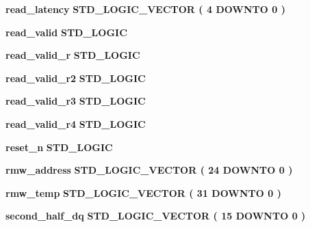 \begin{DoxyCompactItemize}
\item 
{\bf read\+\_\+latency} {\bfseries \textcolor{comment}{S\+T\+D\+\_\+\+L\+O\+G\+I\+C\+\_\+\+V\+E\+C\+T\+OR}\textcolor{vhdlchar}{ }\textcolor{vhdlchar}{(}\textcolor{vhdlchar}{ }\textcolor{vhdlchar}{ } \textcolor{vhdldigit}{4} \textcolor{vhdlchar}{ }\textcolor{keywordflow}{D\+O\+W\+N\+TO}\textcolor{vhdlchar}{ }\textcolor{vhdlchar}{ } \textcolor{vhdldigit}{0} \textcolor{vhdlchar}{ }\textcolor{vhdlchar}{)}\textcolor{vhdlchar}{ }} 
\item 
{\bf read\+\_\+valid} {\bfseries \textcolor{comment}{S\+T\+D\+\_\+\+L\+O\+G\+IC}\textcolor{vhdlchar}{ }} 
\item 
{\bf read\+\_\+valid\+\_\+r} {\bfseries \textcolor{comment}{S\+T\+D\+\_\+\+L\+O\+G\+IC}\textcolor{vhdlchar}{ }} 
\item 
{\bf read\+\_\+valid\+\_\+r2} {\bfseries \textcolor{comment}{S\+T\+D\+\_\+\+L\+O\+G\+IC}\textcolor{vhdlchar}{ }} 
\item 
{\bf read\+\_\+valid\+\_\+r3} {\bfseries \textcolor{comment}{S\+T\+D\+\_\+\+L\+O\+G\+IC}\textcolor{vhdlchar}{ }} 
\item 
{\bf read\+\_\+valid\+\_\+r4} {\bfseries \textcolor{comment}{S\+T\+D\+\_\+\+L\+O\+G\+IC}\textcolor{vhdlchar}{ }} 
\item 
{\bf reset\+\_\+n} {\bfseries \textcolor{comment}{S\+T\+D\+\_\+\+L\+O\+G\+IC}\textcolor{vhdlchar}{ }} 
\item 
{\bf rmw\+\_\+address} {\bfseries \textcolor{comment}{S\+T\+D\+\_\+\+L\+O\+G\+I\+C\+\_\+\+V\+E\+C\+T\+OR}\textcolor{vhdlchar}{ }\textcolor{vhdlchar}{(}\textcolor{vhdlchar}{ }\textcolor{vhdlchar}{ } \textcolor{vhdldigit}{24} \textcolor{vhdlchar}{ }\textcolor{keywordflow}{D\+O\+W\+N\+TO}\textcolor{vhdlchar}{ }\textcolor{vhdlchar}{ } \textcolor{vhdldigit}{0} \textcolor{vhdlchar}{ }\textcolor{vhdlchar}{)}\textcolor{vhdlchar}{ }} 
\item 
{\bf rmw\+\_\+temp} {\bfseries \textcolor{comment}{S\+T\+D\+\_\+\+L\+O\+G\+I\+C\+\_\+\+V\+E\+C\+T\+OR}\textcolor{vhdlchar}{ }\textcolor{vhdlchar}{(}\textcolor{vhdlchar}{ }\textcolor{vhdlchar}{ } \textcolor{vhdldigit}{31} \textcolor{vhdlchar}{ }\textcolor{keywordflow}{D\+O\+W\+N\+TO}\textcolor{vhdlchar}{ }\textcolor{vhdlchar}{ } \textcolor{vhdldigit}{0} \textcolor{vhdlchar}{ }\textcolor{vhdlchar}{)}\textcolor{vhdlchar}{ }} 
\item 
{\bf second\+\_\+half\+\_\+dq} {\bfseries \textcolor{comment}{S\+T\+D\+\_\+\+L\+O\+G\+I\+C\+\_\+\+V\+E\+C\+T\+OR}\textcolor{vhdlchar}{ }\textcolor{vhdlchar}{(}\textcolor{vhdlchar}{ }\textcolor{vhdlchar}{ } \textcolor{vhdldigit}{15} \textcolor{vhdlchar}{ }\textcolor{keywordflow}{D\+O\+W\+N\+TO}\textcolor{vhdlchar}{ }\textcolor{vhdlchar}{ } \textcolor{vhdldigit}{0} \textcolor{vhdlchar}{ }\textcolor{vhdlchar}{)}\textcolor{vhdlchar}{ }} 

\end{DoxyCompactItemize}
